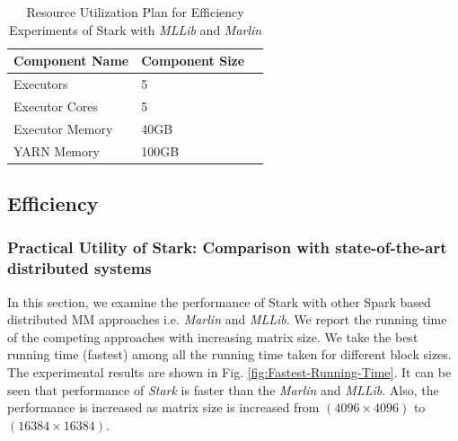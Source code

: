 \begin{table}[h!]
	\caption{Resource Utilization Plan for Efficiency Experiments of Stark with \textit{MLLib} and \textit{Marlin}}
	\label{tab:resourceUtil}
	\begin{minipage}{\columnwidth}
		\begin{center}
			\begin{tabular}{lll}
				\toprule
				Component Name & Component Size \\
				\toprule
				Executors & 5 \\
				Executor Cores & 5 \\
				Executor Memory & 40GB \\
				YARN Memory & 100GB \\
				\bottomrule
			\end{tabular}
		\end{center}
	\end{minipage}
\end{table}

\subsection{Efficiency}

\subsubsection{Practical Utility of Stark: Comparison with state-of-the-art distributed systems}
In this section, we examine the performance of Stark with other Spark based distributed MM approaches i.e. \textit{Marlin} and \textit{MLLib}. We report the running time of the competing approaches with increasing matrix size. We take the best running time (fastest) among all the running time taken for different block sizes. The experimental results are shown in Fig. \ref{fig:Fastest-Running-Time}. It can be seen that performance of \textit{Stark} is faster than the \textit{Marlin} and \textit{MLLib}. Also, the performance is increased as matrix size is increased from $(4096\times 4096)$ to $(16384\times 16384)$. %

